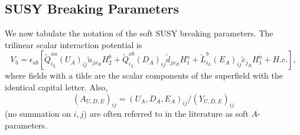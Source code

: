 \documentclass[]{article}
\begin{document}
\subsection{SUSY Breaking Parameters \label{sec:susybreak}}
We now tabulate the notation of the soft SUSY breaking parameters. The
trilinear scalar interaction potential is
\begin{equation}
V_3 = \epsilon_{ab}
\left[
\tilde{Q}_{i_L}^{xa} (U_A)_{ij}  \tilde{u}_{jx_R} H_2^b + 
\tilde{Q}_{i_L}^{xb} (D_A)_{ij}  \tilde{d}_{jx_R} H_1^a + 
\tilde{L}_{i_L}^{b} (E_A)_{ij}  \tilde{e}_{j_R} H_1^a + H.c.\right],
\end{equation}
where fields with a tilde are the scalar components of the superfield with the
identical capital letter. 
Also,
\begin{equation}
(A_{U,D,E})_{ij} = (U_A,D_A,E_A)_{ij} / (Y_{U,D,E})_{ij} 
\end{equation}
(no summation on $i,j$) are often referred to in the literature as soft
$A$-parameters.
\end{document}
